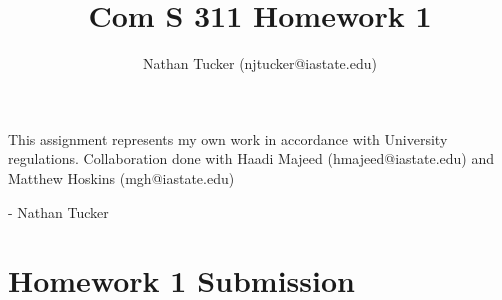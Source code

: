 \documentclass[11pt]{amsart}
\begin{document}

\title{Com S 311 Homework 1}
\author{Nathan Tucker (njtucker@iastate.edu)}
\maketitle

\doublespacing

\vspace{10mm}

\vfill
\begin{flushright}
This assignment represents my own work in accordance with University regulations. Collaboration done with Haadi Majeed (hmajeed@iastate.edu) and Matthew Hoskins (mgh@iastate.edu)

- Nathan Tucker
\end{flushright}
\newpage
\vspace{-.8cm}

\section*{Homework 1 Submission}

%
\end{document}
